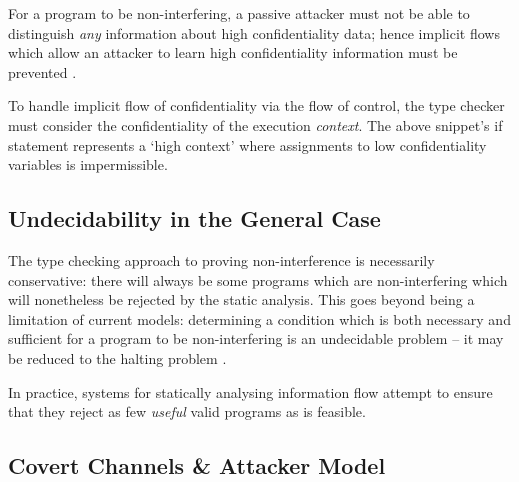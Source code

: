 For a program to be non-interfering, a passive attacker must not be able to distinguish \textit{any} information about high confidentiality data; hence implicit flows which allow an attacker to learn high confidentiality information must be prevented \cite{sabelfeld2003if}.


To handle implicit flow of confidentiality via the flow of control, the type checker must consider the confidentiality of the execution \textit{context}. The above snippet's if statement represents a `high context' where assignments to low confidentiality variables is impermissible.

\subsection{Undecidability in the General Case}

The type checking approach to proving non-interference is necessarily conservative: there will always be some programs which are non-interfering which will nonetheless be rejected by the static analysis. This goes beyond being a limitation of current models: determining a condition which is both necessary and sufficient for a program to be non-interfering is an undecidable problem \cite{denning1977certification} \cite{landi1992undecidability} -- it may be reduced to the halting problem \cite{sabelfeld2003if}.

%


In practice, systems for statically analysing information flow attempt to ensure that they reject as few \textit{useful} valid programs as is feasible.

\subsection{Covert Channels \& Attacker Model}

